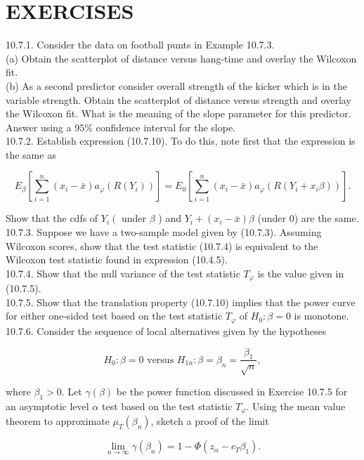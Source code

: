 \section*{EXERCISES}
10.7.1. Consider the data on football punts in Example 10.7.3.\\
(a) Obtain the scatterplot of distance versus hang-time and overlay the Wilcoxon fit.\\
(b) As a second predictor consider overall strength of the kicker which is in the variable strength. Obtain the scatterplot of distance versus strength and overlay the Wilcoxon fit. What is the meaning of the slope parameter for this predictor. Answer using a $95 \%$ confidence interval for the slope.\\
10.7.2. Establish expression (10.7.10). To do this, note first that the expression is the same as

$$
E_{\beta}\left[\sum_{i=1}^{n}\left(x_{i}-\bar{x}\right) a_{\varphi}\left(R\left(Y_{i}\right)\right)\right]=E_{0}\left[\sum_{i=1}^{n}\left(x_{i}-\bar{x}\right) a_{\varphi}\left(R\left(Y_{i}+x_{i} \beta\right)\right)\right] .
$$

Show that the cdfs of $Y_{i}\left(\right.$ under $\beta$ ) and $Y_{i}+\left(x_{i}-\bar{x}\right) \beta$ (under 0) are the same.\\
10.7.3. Suppose we have a two-sample model given by (10.7.3). Assuming Wilcoxon scores, show that the test statistic (10.7.4) is equivalent to the Wilcoxon test statistic found in expression (10.4.5).\\
10.7.4. Show that the null variance of the test statistic $T_{\varphi}$ is the value given in (10.7.5).\\
10.7.5. Show that the translation property (10.7.10) implies that the power curve for either one-sided test based on the test statistic $T_{\varphi}$ of $H_{0}: \beta=0$ is monotone.\\
10.7.6. Consider the sequence of local alternatives given by the hypotheses

$$
H_{0}: \beta=0 \text { versus } H_{1 n}: \beta=\beta_{n}=\frac{\beta_{1}}{\sqrt{n}},
$$

where $\beta_{1}>0$. Let $\gamma(\beta)$ be the power function discussed in Exercise 10.7.5 for an asymptotic level $\alpha$ test based on the test statistic $T_{\varphi}$. Using the mean value theorem to approximate $\mu_{T}\left(\beta_{n}\right)$, sketch a proof of the limit


\begin{equation*}
\lim _{n \rightarrow \infty} \gamma\left(\beta_{n}\right)=1-\Phi\left(z_{\alpha}-c_{T} \beta_{1}\right) . \tag{10.7.17}
\end{equation*}


